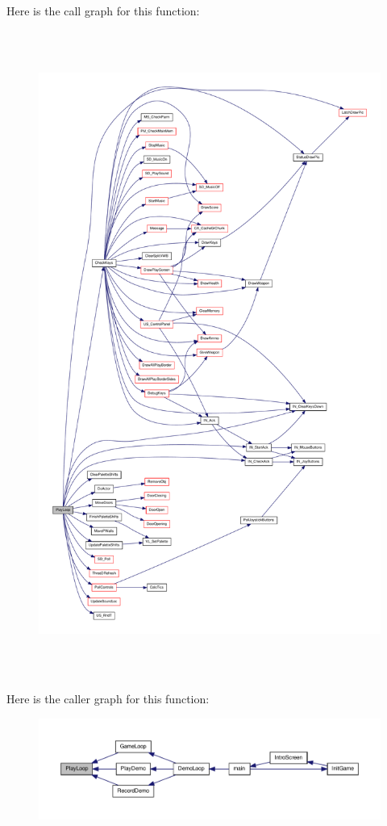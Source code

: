 Here is the call graph for this function:
\nopagebreak
\begin{figure}[H]
\begin{center}
\leavevmode
\includegraphics[height=600pt]{WL__PLAY_8C_a1093a19e7a1263f20a026e662db7121f_cgraph}
\end{center}
\end{figure}




Here is the caller graph for this function:
\nopagebreak
\begin{figure}[H]
\begin{center}
\leavevmode
\includegraphics[width=400pt]{WL__PLAY_8C_a1093a19e7a1263f20a026e662db7121f_icgraph}
\end{center}
\end{figure}


